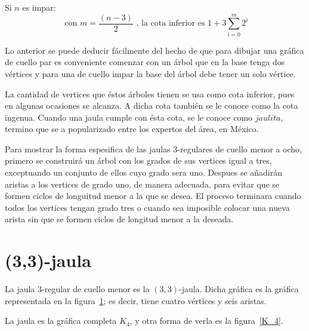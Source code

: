 \documentclass[11pt]{book}
\theoremstyle{definition}
\begin{document}
Si $n$ es impar:
\begin{equation*}
  \text{ con } m=\frac{(n-3)}{2} \text{ , la cota inferior es } 1 + 3\sum^m_{i=0} 2^i
\end{equation*}

Lo anterior se puede deducir fácilmente del hecho de que para dibujar
una gráfica de cuello par es conveniente comenzar con un árbol que en
la base tenga dos vértices y para una de cuello impar la base del
árbol debe tener un solo vértice. 

La cantidad de vertices que éstos
árboles tienen se usa como cota inferior, pues en algunas ocasiones se alcanza.
A dicha cota también se le conoce como la cota ingenua. Cuando una jaula cumple con ésta cota, se le conoce como
$jaulita$, termino que se a popularizado entre los
expertos del área, en México.


Para mostrar la forma espesifica de las jaulas $3$-regulares de cuello
menor a ocho, primero se construirá un árbol con los grados de sus
vertices igual a tres, exceptuando un conjunto de ellos cuyo grado sera uno. 
Despues se añadirán aristas a los vertices de grado uno, de manera
adecuada, para evitar que se formen ciclos de longuitud menor a la que
se desea. El proceso terminara cuando todos los vertices tengan grado
tres o cuando sea imposible colocar una nueva arista sin que se formen
ciclos de longitud menor a la deseada.


\section{(3,3)-jaula}

La jaula $3$-regular de cuello menor es la $(3,3)$-jaula. Dicha gráfica es la gráfica representada en la figura~\ref{jaula(3,3)}; es decir, tiene cuatro vértices y seis aristas.

\begin{figure}[htb]
  \centering
  \caption{} \label{jaula(3,3)}
\end{figure}

La jaula es la gráfica completa $K_4$, y otra forma de verla es la figura~\ref{K_4}.
\end{document}
